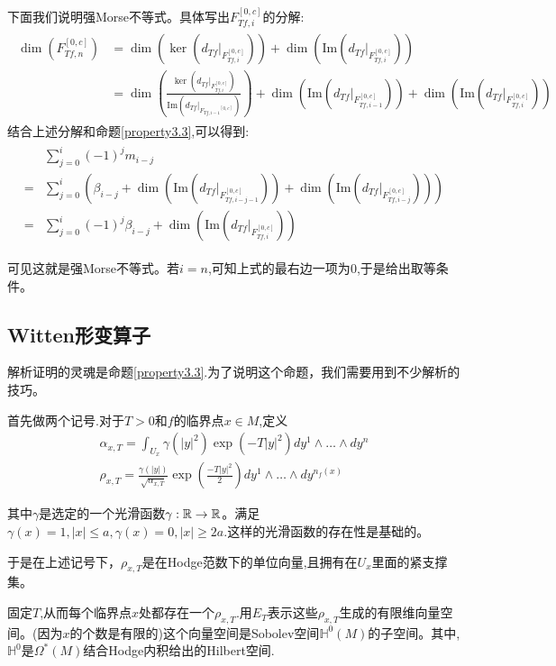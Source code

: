 下面我们说明强Morse不等式。具体写出$F_{Tf,i}^{[0,c]}$的分解:
\begin{align}
\begin{split}	\dim(F_{Tf,n}^{[0,c]})&=\dim(\ker(d_{Tf}|_{F_{Tf,i}^{[0,c]}}))+\dim(\mathrm{Im}(d_{Tf}|_{F_{Tf,i}^{[0,c]}}))\\&=\dim(\frac{\ker(d_{Tf}|_{F_{Tf,i}^{[0,c]}})}{\mathrm{Im}(d_{Tf}|_{{F_{Tf,i-1}}^{[0,c]}})})+\dim(\mathrm{Im}(d_{Tf}|_{F_{Tf,i-1}^{[0,c]}}))+\dim(\mathrm{Im}(d_{Tf}|_{F_{Tf,i}^{[0,c]}}))
\end{split}
\end{align}
结合上述分解和命题\ref{property3.3},可以得到:
    \begin{align}
	\begin{split}
		&\sum_{j=0}^i (-1)^j m_{i-j}\\
   =&\sum_{j=0}^i(\beta_{i-j}+\dim(\mathrm{Im}(d_{Tf}|_{F_{Tf,i-j-1}^{[0,c]}}))+\dim(\mathrm{Im}(d_{Tf}|_{F_{Tf,i-j}^{[0,c]}})))\\
   =& \sum_{j=0}^i (-1)^j \beta_{i-j}+\dim(\mathrm{Im}(d_{Tf}|_{F_{Tf,i}^{[0,c]}}))
	\end{split}
   \end{align}

可见这就是强Morse不等式。若$i=n$,可知上式的最右边一项为$0$,于是给出取等条件。
\subsection{Witten形变算子}
解析证明的灵魂是命题\ref{property3.3}.为了说明这个命题，我们需要用到不少解析的技巧。

首先做两个记号.对于$T>0$和$f$的临界点$x \in M$,定义
\begin{align*}
    \alpha_{x,T}=\int_{U_x}\gamma(|y|^2)\exp(-T|y|^2)dy^1\wedge \dots \wedge dy^n\\
	\rho_{x,T}=\frac{\gamma(|y|)}{\sqrt{\alpha_{x,T}}}\exp(\frac{-T|y|^2}{2})dy^1\wedge \dots \wedge dy^{n_f(x)}
\end{align*}

其中$\gamma$是选定的一个光滑函数$\gamma:\mathbb{R} \to \mathbb{R}$。满足$\gamma(x)=1,|x|\leq a,\gamma(x)=0,|x|\geq 2a$.这样的光滑函数的存在性是基础的。

于是在上述记号下，$\rho_{x,T}$是在Hodge范数下的单位向量,且拥有在$U_x$里面的紧支撑集。

固定$T$,从而每个临界点$x$处都存在一个$\rho_{x,T}$.用$E_T$表示这些$\rho_{x,T}$生成的有限维向量空间。(因为$x$的个数是有限的)这个向量空间是Sobolev空间$\mathbb{H}^0(M)$的子空间。其中,$\mathbb{H}^0$是$\Omega^*(M)$结合Hodge内积给出的Hilbert空间.

